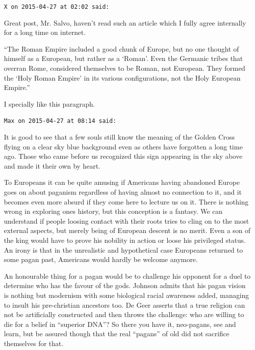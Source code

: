 \begin{footnotesize}
\begin{sffamily}
\texttt{X on 2015-04-27 at 02:02 said:}

Great post, Mr. Salvo, haven't read such an article which I fully agree internally for a long time on internet.

``The Roman Empire included a good chunk of Europe, but no one thought of himself as a European, but rather as a `Roman'. Even the Germanic tribes that overran Rome, considered themselves to be Roman, not European. They formed the `Holy Roman Empire' in its various configurations, not the Holy European Empire.''

I specially like this paragraph.

\hfill

\texttt{Max on 2015-04-27 at 08:14 said:}

It is good to see that a few souls still know the meaning of the Golden Cross flying on a clear sky blue background even as others have forgotten a long time ago. Those who came before us recognized this sign appearing in the sky above and made it their own by heart.

To Europeans it can be quite amusing if Americans having abandoned Europe goes on about paganism regardless of having almost no connection to it, and it becomes even more absurd if they come here to lecture us on it. There is nothing wrong in exploring ones history, but this conception is a fantasy. We can understand if people loosing contact with their roots tries to cling on to the most external aspects, but merely being of European descent is no merit. Even a son of the king would have to prove his nobility in action or loose his privileged status. An irony is that in the unrealistic and hypothetical case Europeans returned to some pagan past, Americans would hardly be welcome anymore.

An honourable thing for a pagan would be to challenge his opponent for a duel to determine who has the favour of the gods. Johnson admits that his pagan vision is nothing but modernism with some biological racial awareness added, managing to insult his pre-christian ancestors too. De Geer asserts that a true religion can not be artificially constructed and then throws the challenge: who are willing to die for a belief in ``superior DNA''? So there you have it, neo-pagans, see and learn, but be assured though that the real ``pagans'' of old did not sacrifice themselves for that.

\hfill


\end{sffamily}
\end{footnotesize}

